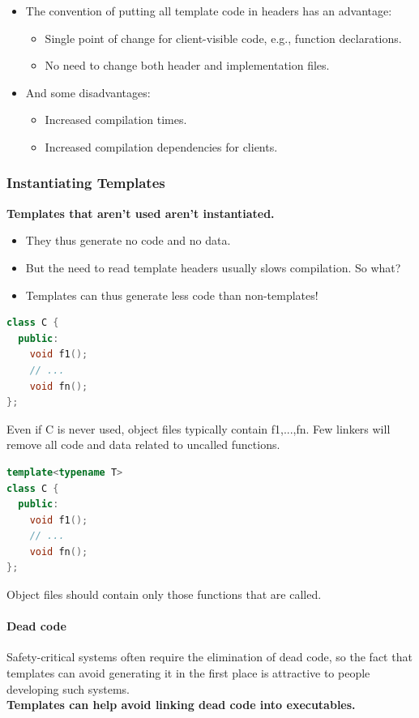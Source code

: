 \begin{itemize}
  \item The convention of putting all template code in headers has an advantage:
  \begin{itemize}
    \item Single point of change for client-visible code, e.g., function declarations.
    \item No need to change both header and implementation files.
  \end{itemize}
  \item And some disadvantages:
  \begin{itemize}
    \item Increased compilation times.
    \item Increased compilation dependencies for clients.
  \end{itemize}
\end{itemize}

\subsubsection{Instantiating Templates}
\textbf{Templates that aren't used aren't instantiated.}
\begin{itemize}
  \item They thus generate no code and no data.
  \item But the need to read template headers usually slows compilation. So what?
  \item Templates can thus generate less code than non-templates!
\end{itemize}
\begin{multicols}{2}
\begin{lstlisting}[language=C++]
class C {
  public:
    void f1();
    // ...
    void fn();
};
\end{lstlisting}
Even if C is never used, object files typically contain f1,...,fn. Few linkers will remove all code and data related to uncalled functions.
\vfill\null
\columnbreak
\begin{lstlisting}[language=C++]
template<typename T>
class C {
  public:
    void f1();
    // ...
    void fn();
};
\end{lstlisting}
Object files should contain only those functions that are called.
\end{multicols}

\paragraph{Dead code}
Safety-critical systems often require the elimination of dead code, so the fact that templates can avoid generating it in the first place is attractive to people developing such systems.\\
\textbf{Templates can help avoid linking dead code into executables.}

